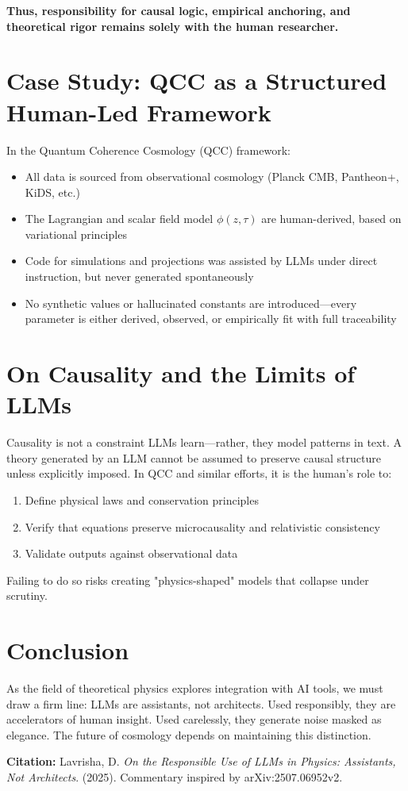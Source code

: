 \documentclass[12pt]{article}
\begin{document}
\textbf{Thus, responsibility for causal logic, empirical anchoring, and theoretical rigor remains solely with the human researcher.}

\section{Case Study: QCC as a Structured Human-Led Framework}
In the Quantum Coherence Cosmology (QCC) framework:
\begin{itemize}
  \item All data is sourced from observational cosmology (Planck CMB, Pantheon+, KiDS, etc.)
  \item The Lagrangian and scalar field model \( \phi(z, \tau) \) are human-derived, based on variational principles
  \item Code for simulations and projections was assisted by LLMs under direct instruction, but never generated spontaneously
  \item No synthetic values or hallucinated constants are introduced—every parameter is either derived, observed, or empirically fit with full traceability
\end{itemize}

\section{On Causality and the Limits of LLMs}
Causality is not a constraint LLMs learn—rather, they model patterns in text. A theory generated by an LLM cannot be assumed to preserve causal structure unless explicitly imposed. In QCC and similar efforts, it is the human's role to:
\begin{enumerate}
  \item Define physical laws and conservation principles
  \item Verify that equations preserve microcausality and relativistic consistency
  \item Validate outputs against observational data
\end{enumerate}

Failing to do so risks creating "physics-shaped" models that collapse under scrutiny.

\section{Conclusion}
As the field of theoretical physics explores integration with AI tools, we must draw a firm line: LLMs are assistants, not architects. Used responsibly, they are accelerators of human insight. Used carelessly, they generate noise masked as elegance. The future of cosmology depends on maintaining this distinction.

\vspace{1em}
\noindent\textbf{Citation:} Lavrisha, D. \textit{On the Responsible Use of LLMs in Physics: Assistants, Not Architects}. (2025). Commentary inspired by arXiv:2507.06952v2.
\end{document}
